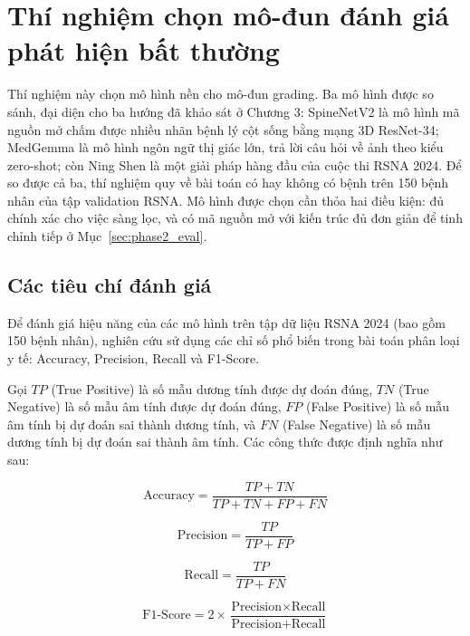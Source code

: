 \section{Thí nghiệm chọn mô-đun đánh giá phát hiện bất thường}
\label{sec:eval_detection}

Thí nghiệm này chọn mô hình nền cho mô-đun grading. Ba mô hình được so sánh, đại diện cho ba hướng đã khảo sát ở Chương 3: SpineNetV2 là mô hình mã nguồn mở chấm được nhiều nhãn bệnh lý cột sống bằng mạng 3D ResNet-34; MedGemma là mô hình ngôn ngữ thị giác lớn, trả lời câu hỏi về ảnh theo kiểu zero-shot; còn Ning Shen là một giải pháp hàng đầu của cuộc thi RSNA 2024. Để so được cả ba, thí nghiệm quy về bài toán có hay không có bệnh trên 150 bệnh nhân của tập validation RSNA. Mô hình được chọn cần thỏa hai điều kiện: đủ chính xác cho việc sàng lọc, và có mã nguồn mở với kiến trúc đủ đơn giản để tinh chỉnh tiếp ở Mục~\ref{sec:phase2_eval}.

\subsection{Các tiêu chí đánh giá}
Để đánh giá hiệu năng của các mô hình trên tập dữ liệu RSNA 2024 (bao gồm 150 bệnh nhân), nghiên cứu sử dụng các chỉ số phổ biến trong bài toán phân loại y tế: Accuracy, Precision, Recall và F1-Score.

Gọi $TP$ (True Positive) là số mẫu dương tính được dự đoán đúng, $TN$ (True Negative) là số mẫu âm tính được dự đoán đúng, $FP$ (False Positive) là số mẫu âm tính bị dự đoán sai thành dương tính, và $FN$ (False Negative) là số mẫu dương tính bị dự đoán sai thành âm tính. Các công thức được định nghĩa như sau:

\begin{equation}
    \text{Accuracy} = \frac{TP + TN}{TP + TN + FP + FN}
\end{equation}

\begin{equation}
    \text{Precision} = \frac{TP}{TP + FP}
\end{equation}

\begin{equation}
    \text{Recall} = \frac{TP}{TP + FN}
\end{equation}

\begin{equation}
    \text{F1-Score} = 2 \times \frac{\text{Precision} \times \text{Recall}}{\text{Precision} + \text{Recall}}
\end{equation}

